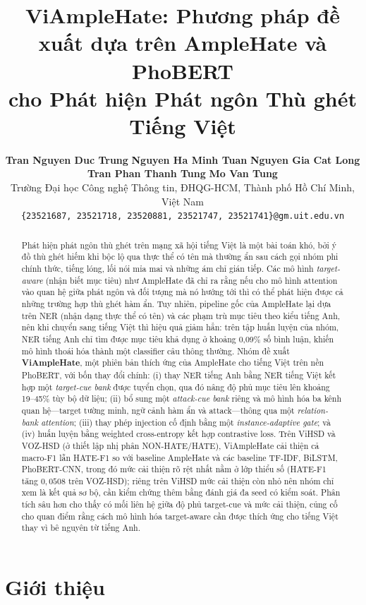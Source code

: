 \documentclass[11pt]{article}
\title{ViAmpleHate: Phương pháp đề xuất dựa trên AmpleHate và PhoBERT\\ cho Phát hiện Phát ngôn Thù ghét Tiếng Việt}
\author{
  \textbf{Tran Nguyen Duc Trung} \quad
  \textbf{Nguyen Ha Minh Tuan} \quad
  \textbf{Nguyen Gia Cat Long} \\
  \textbf{Tran Phan Thanh Tung} \quad
  \textbf{Mo Van Tung} \\[4pt]
  Trường Đại học Công nghệ Thông tin, ĐHQG-HCM, Thành phố Hồ Chí Minh, Việt Nam \\
  \texttt{\{23521687, 23521718, 23520881, 23521747, 23521741\}@gm.uit.edu.vn}
}
\begin{document}
\maketitle

\begin{abstract}
Phát hiện phát ngôn thù ghét trên mạng xã hội tiếng Việt là một bài toán khó, bởi ý đồ thù ghét hiếm khi bộc lộ qua thực thể có tên mà thường ẩn sau cách gọi nhóm phi chính thức, tiếng lóng, lối nói mỉa mai và những ám chỉ gián tiếp. Các mô hình \emph{target-aware} (nhận biết mục tiêu) như AmpleHate đã chỉ ra rằng nếu cho mô hình attention vào quan hệ giữa phát ngôn và đối tượng mà nó hướng tới thì có thể phát hiện được cả những trường hợp thù ghét hàm ẩn. Tuy nhiên, pipeline gốc của AmpleHate lại dựa trên NER (nhận dạng thực thể có tên) và các phạm trù mục tiêu theo kiểu tiếng Anh, nên khi chuyển sang tiếng Việt thì hiệu quả giảm hẳn: trên tập huấn luyện của nhóm, NER tiếng Anh chỉ tìm được mục tiêu khả dụng ở khoảng 0,09\% số bình luận, khiến mô hình thoái hóa thành một classifier câu thông thường. Nhóm đề xuất \textbf{ViAmpleHate}, một phiên bản thích ứng của AmpleHate cho tiếng Việt trên nền PhoBERT, với bốn thay đổi chính: (i) thay NER tiếng Anh bằng NER tiếng Việt kết hợp một \emph{target-cue bank} được tuyển chọn, qua đó nâng độ phủ mục tiêu lên khoảng 19--45\% tùy bộ dữ liệu; (ii) bổ sung một \emph{attack-cue bank} riêng và mô hình hóa ba kênh quan hệ---target tường minh, ngữ cảnh hàm ẩn và attack---thông qua một \emph{relation-bank attention}; (iii) thay phép injection cố định bằng một \emph{instance-adaptive gate}; và (iv) huấn luyện bằng weighted cross-entropy kết hợp contrastive loss. Trên ViHSD và VOZ-HSD (ở thiết lập nhị phân NON-HATE/HATE), ViAmpleHate cải thiện cả macro-F1 lẫn HATE-F1 so với baseline AmpleHate và các baseline TF-IDF, BiLSTM, PhoBERT-CNN, trong đó mức cải thiện rõ rệt nhất nằm ở lớp thiểu số (HATE-F1 tăng $0{,}0508$ trên VOZ-HSD); riêng trên ViHSD mức cải thiện còn nhỏ nên nhóm chỉ xem là kết quả sơ bộ, cần kiểm chứng thêm bằng đánh giá đa seed có kiểm soát. Phân tích sâu hơn cho thấy có mối liên hệ giữa độ phủ target-cue và mức cải thiện, củng cố cho quan điểm rằng cách mô hình hóa target-aware cần được thích ứng cho tiếng Việt thay vì bê nguyên từ tiếng Anh.
\end{abstract}

\section{Giới thiệu}
\end{document}
